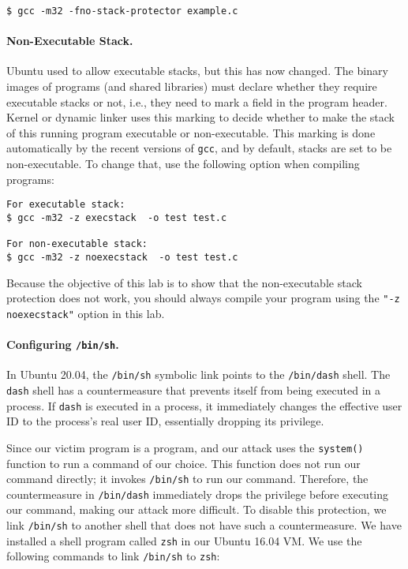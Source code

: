 \begin{lstlisting}
$ gcc -m32 -fno-stack-protector example.c
\end{lstlisting}


\paragraph{Non-Executable Stack.} Ubuntu used to allow executable stacks,
but this has now changed. The binary images of programs (and shared
libraries) must declare whether they require executable stacks or not,
i.e., they need to mark a field in the program header. Kernel or dynamic
linker uses this marking to decide whether to make the stack of this
running program executable or non-executable. This marking is done
automatically by the recent versions of {\tt gcc}, and by default, 
stacks are set to be non-executable.  
To change that, use the following option when compiling programs:


\begin{lstlisting}
For executable stack:
$ gcc -m32 -z execstack  -o test test.c

For non-executable stack:
$ gcc -m32 -z noexecstack  -o test test.c
\end{lstlisting}



Because the objective of this lab is to show that the non-executable stack
protection does not work, you should always compile your program using the 
{\tt "-z noexecstack"} option in this lab.


\paragraph{Configuring \texttt{/bin/sh}.} In Ubuntu 20.04, 
the \texttt{/bin/sh} symbolic link points to
the \texttt{/bin/dash} shell. 
The \texttt{dash} shell has a countermeasure
that prevents itself from being executed in a \setuid process.
If \texttt{dash} is 
executed in a \setuid process, it immediately
changes the effective user ID to the process's real user ID, essentially
dropping its privilege. 

Since our victim program is a \setuid program, and our
attack uses the \texttt{system()} function to run a command of our
choice. This function does not run our command directly; it 
invokes \texttt{/bin/sh} to run our command. Therefore, 
the countermeasure in \texttt{/bin/dash} immediately drops
the \setuid privilege before executing our command, making our 
attack more difficult. To disable this protection, 
we link \texttt{/bin/sh} to another shell that does not
have such a countermeasure.
We have installed a shell program
called \texttt{zsh} in our Ubuntu 16.04 VM. We use the following
commands to link \texttt{/bin/sh} to \texttt{zsh}:

